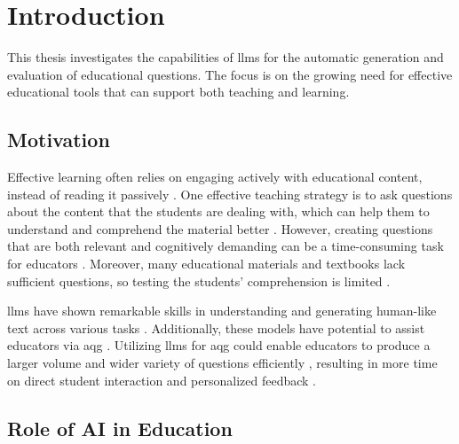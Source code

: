 \section{Introduction}

This thesis investigates the capabilities of \ac{llms} for the automatic generation and evaluation of educational questions. The focus is on the growing need for effective educational tools that can support both teaching and learning.

\subsection{Motivation}

Effective learning often relies on engaging actively with educational content, instead of reading it passively \cite{steuer_i_2021}. One effective teaching strategy is to ask questions about the content that the students are dealing with, which can help them to understand and comprehend the material better \cite{steuer_i_2021}. However, creating questions that are both relevant and cognitively demanding can be a time-consuming task for educators \cite{steuer_i_2021,vu_chatgpt-based_2024}. Moreover, many educational materials and textbooks lack sufficient questions, so testing the students' comprehension is limited \cite{steuer_i_2021}.

\ac{llms} have shown remarkable skills in understanding and generating human-like text across various tasks \cite{wang_history_2024}. 
Additionally, these models have potential to assist educators via \ac{aqg} \cite{vu_chatgpt-based_2024,ling_automatic_2024}. Utilizing \ac{llms} for \ac{aqg} could enable educators to produce a larger volume and wider variety of questions efficiently \cite{scaria_how_2024,hang_mcqgen_2024}, 
resulting in more time on direct student interaction \cite{doughty_comparative_2024,al_faraby_analysis_2024} and personalized feedback \cite{ling_automatic_2024}.

\subsection{Role of AI in Education}


